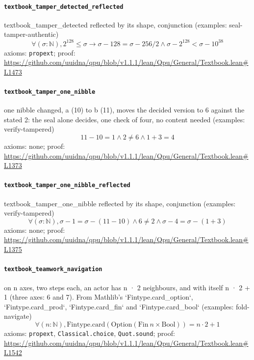 \documentclass[11pt]{article}
\begin{document}
\paragraph{\texttt{textbook\_tamper\_detected\_reflected}}
textbook\_tamper\_detected reflected by its shape, conjunction (examples: seal-tamper-authentic)
\[ \forall (\sigma : \mathbb{N}), 2 ^{128} \le \sigma \to \sigma - 128 = \sigma - 256 / 2 \land \sigma - 2 ^{128} < \sigma - 10 ^{38} \]
\noindent axioms: \texttt{propext}; proof: \url{https://github.com/uuidna/qpu/blob/v1.1.1/lean/Qpu/General/Textbook.lean\#L1473}

\paragraph{\texttt{textbook\_tamper\_one\_nibble}}
one nibble changed, a (10) to b (11), moves the decided version to 6 against the stated 2: the seal alone decides, one check of four, no content needed (examples: verify-tampered)
\[ 11 - 10 = 1 \land 2 \ne 6 \land 1 + 3 = 4 \]
\noindent axioms: none; proof: \url{https://github.com/uuidna/qpu/blob/v1.1.1/lean/Qpu/General/Textbook.lean\#L1373}

\paragraph{\texttt{textbook\_tamper\_one\_nibble\_reflected}}
textbook\_tamper\_one\_nibble reflected by its shape, conjunction (examples: verify-tampered)
\[ \forall (\sigma : \mathbb{N}), \sigma - 1 = \sigma - (11 - 10) \land 6 \ne 2 \land \sigma - 4 = \sigma - (1 + 3) \]
\noindent axioms: none; proof: \url{https://github.com/uuidna/qpu/blob/v1.1.1/lean/Qpu/General/Textbook.lean\#L1375}

\paragraph{\texttt{textbook\_teamwork\_navigation}}
on n axes, two steps each, an actor has n · 2 neighbours, and with itself n · 2 + 1 (three axes: 6 and 7). From Mathlib's `Fintype.card\_option`, `Fintype.card\_prod`, `Fintype.card\_fin` and `Fintype.card\_bool` (examples: fold-navigate)
\[ \forall (n : \mathbb{N}), \mathrm{Fintype.card} (\mathrm{Option} (\mathrm{Fin}\ n \times \mathrm{Bool})) = n \cdot 2 + 1 \]
\noindent axioms: \texttt{propext}, \texttt{Classical.choice}, \texttt{Quot.sound}; proof: \url{https://github.com/uuidna/qpu/blob/v1.1.1/lean/Qpu/General/Textbook.lean\#L1542}
\end{document}
